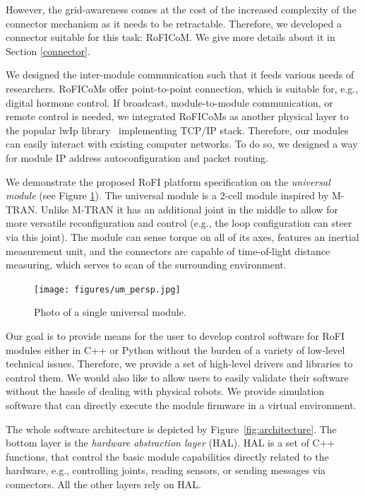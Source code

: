 However, the grid-awareness comes at the cost of the increased complexity of the
connector mechanism as it needs to be retractable. Therefore, we developed a
connector suitable for this task: RoFICoM. We give more details about it in
Section \ref{connector}.

We designed the inter-module communication such that it feeds various needs of
researchers. RoFICoMs offer point-to-point connection, which is suitable for,
e.g., digital hormone control. If broadcast, module-to-module communication, or
remote control is needed, we integrated RoFICoMs as another physical layer to
the popular lwIp library~\cite{lwip} implementing TCP/IP stack. Therefore, our
modules can easily interact with existing computer networks. To do so, we
designed a way for module IP address autoconfiguration and packet routing.

We demonstrate the proposed RoFI platform specification on the \emph{universal
module} (see Figure \ref{fig:umPhoto}). The universal module is a 2-cell module
inspired by M-TRAN. Unlike M-TRAN it has an additional joint in the middle to
allow for more versatile reconfiguration and control (e.g., the loop
configuration can steer via this joint). The module can sense torque on all of
its axes, features an inertial measurement unit, and the connectors are capable
of time-of-light distance measuring, which serves to scan of the
surrounding environment.

\begin{figure}[t]
    \centering
    \texttt{[image: figures/um\_persp.jpg]}
    \caption{Photo of a single universal module.}
    \label{fig:umPhoto}
\end{figure}

Our goal is to provide means for the user to develop control software for RoFI
modules either in C++ or Python without the burden of a variety of low-level
technical issues. Therefore, we provide a set of high-level drivers and
libraries to control them. We would also like to allow users to easily validate
their software without the hassle of dealing with physical robots. We provide
simulation software that can directly execute the module firmware in a virtual
environment.

The whole software architecture is depicted by Figure~\ref{fig:architecture}.
The bottom layer is the \emph{hardware abstraction layer} (HAL). HAL is a set of
C++ functions, that control the basic module capabilities directly related to
the hardware, e.g., controlling joints, reading sensors, or sending messages via
connectors. All the other layers rely on HAL.

